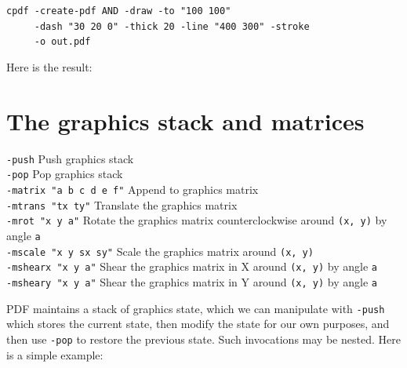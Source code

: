 \documentclass{book}
\begin{document}
\begin{framed}
 \noindent\small\verb?cpdf -create-pdf AND -draw -to "100 100"?\\
 \noindent\small\verb?     -dash "30 20 0" -thick 20 -line "400 300" -stroke?\\
 \noindent\small\verb?     -o out.pdf?
\end{framed}

\noindent Here is the result:

\bigskip
{}
\bigskip

\section{The graphics stack and matrices}
  {\small\begin{framed}
   \noindent\verb!-push! Push graphics stack\\
   \noindent\verb!-pop! Pop graphics stack\\
   \noindent\verb!-matrix "a b c d e f"! Append to graphics matrix\\
   \noindent\verb!-mtrans "tx ty"! Translate the graphics matrix\\
   \noindent\verb!-mrot "x y a"! Rotate the graphics matrix counterclockwise around \texttt{(x, y)} by angle \texttt{a}\\
   \noindent\verb!-mscale "x y sx sy"! Scale the graphics matrix around \texttt{(x, y)}\\
   \noindent\verb!-mshearx "x y a"! Shear the graphics matrix in X around \texttt{(x, y)} by angle \texttt{a}\\
   \noindent\verb!-msheary "x y a"! Shear the graphics matrix in Y around \texttt{(x, y)} by angle \texttt{a}
  \end{framed}}

PDF maintains a stack of graphics state, which we can manipulate with \texttt{-push} which stores the current state, then modify the state for our own purposes, and then use \texttt{-pop} to restore the previous state. Such invocations may be nested. Here is a simple example:
 
\end{document}
